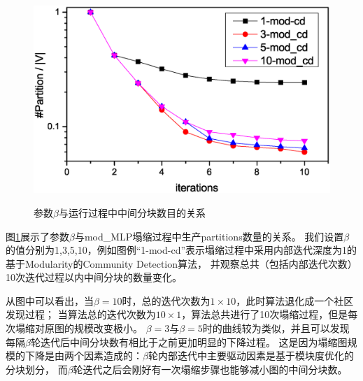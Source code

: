 \documentclass[master]{njuthesis}
\begin{document}
\begin{figure}[h]
  \centering
  \includegraphics[width= 1\textwidth]{figure/conv_time.eps}\\
  \caption{参数$\beta$与运行过程中中间分块数目的关系}
   \label{fig:conv_time}
\end{figure}

图\ref{fig:conv_time}展示了参数$\beta$与mod\string_MLP塌缩过程中生产partitions数量的关系。
我们设置$\beta$的值分别为1,3,5,10，例如图例“1-mod-cd”表示塌缩过程中采用内部迭代深度为1的基于Modularity的Community Detection算法，
并观察总共（包括内部迭代次数）10次迭代过程以内中间分块的数量变化。

从图中可以看出，当$\beta=10$时，总的迭代次数为$1\times 10$，此时算法退化成一个社区发现过程；
当算法总的迭代次数为$10\times 1$，算法总共进行了10次塌缩过程，但是每次塌缩对原图的规模改变极小。
$\beta=3$与$\beta=5$时的曲线较为类似，并且可以发现每隔$\beta$轮迭代后中间分块数有相比于之前更加明显的下降过程。
这是因为塌缩图规模的下降是由两个因素造成的：$\beta$轮内部迭代中主要驱动因素是基于模块度优化的分块划分，
而$\beta$轮迭代之后会刚好有一次塌缩步骤也能够减小图的中间分块数。
\end{document}
